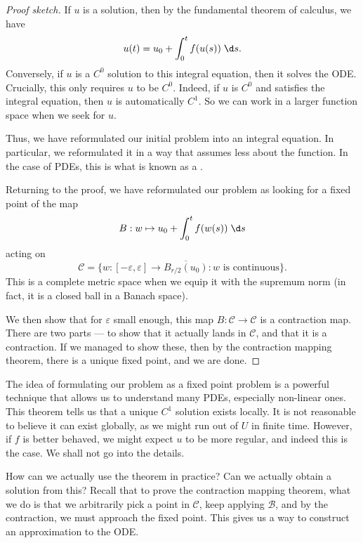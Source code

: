 \documentclass[a4paper]{article}
\begin{document}
\begin{proof}[Proof sketch]
  If $u$ is a solution, then by the fundamental theorem of calculus, we have
  \[
    u(t) = u_0 + \int_0^t f(u(s))\;\d s.
  \]
  Conversely, if $u$ is a $C^0$ solution to this integral equation, then it solves the ODE. Crucially, this only requires $u$ to be $C^0$. Indeed, if $u$ is $C^0$ and satisfies the integral equation, then $u$ is automatically $C^1$. So we can work in a larger function space when we seek for $u$.

  Thus, we have reformulated our initial problem into an integral equation. In particular, we reformulated it in a way that assumes less about the function. In the case of PDEs, this is what is known as a .

  Returning to the proof, we have reformulated our problem as looking for a fixed point of the map
  \[
    B: w \mapsto u_0+ \int_0^t f(w(s))\;\d s
  \]
  acting on
  \[
    \mathcal{C} = \{w: [-\varepsilon, \varepsilon] \to \overline{B_{r/2}(u_0)} : w\text{ is continuous}\}.
  \]
  This is a complete metric space when we equip it with the supremum norm (in fact, it is a closed ball in a Banach space).

  We then show that for $\varepsilon$ small enough, this map $B: \mathcal{C} \to \mathcal{C}$ is a contraction map. There are two parts --- to show that it actually lands in $\mathcal{C}$, and that it is a contraction. If we managed to show these, then by the contraction mapping theorem, there is a unique fixed point, and we are done.
\end{proof}

The idea of formulating our problem as a fixed point problem is a powerful technique that allows us to understand many PDEs, especially non-linear ones. This theorem tells us that a unique $C^1$ solution exists locally. It is not reasonable to believe it can exist globally, as we might run out of $U$ in finite time. However, if $f$ is better behaved, we might expect $u$ to be more regular, and indeed this is the case. We shall not go into the details.

How can we actually use the theorem in practice? Can we actually obtain a solution from this? Recall that to prove the contraction mapping theorem, what we do is that we arbitrarily pick a point in $\mathcal{C}$, keep applying $\mathcal{B}$, and by the contraction, we must approach the fixed point. This gives us a way to construct an approximation to the ODE.
\end{document}
